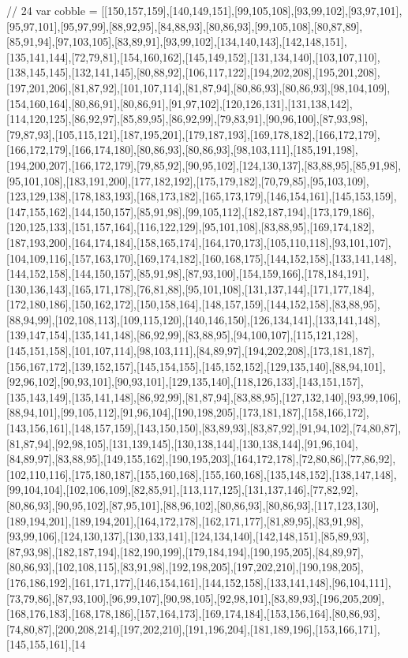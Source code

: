 // 24
var cobble = [[150,157,159],[140,149,151],[99,105,108],[93,99,102],[93,97,101],[95,97,101],[95,97,99],[88,92,95],[84,88,93],[80,86,93],[99,105,108],[80,87,89],[85,91,94],[97,103,105],[83,89,91],[93,99,102],[134,140,143],[142,148,151],[135,141,144],[72,79,81],[154,160,162],[145,149,152],[131,134,140],[103,107,110],[138,145,145],[132,141,145],[80,88,92],[106,117,122],[194,202,208],[195,201,208],[197,201,206],[81,87,92],[101,107,114],[81,87,94],[80,86,93],[80,86,93],[98,104,109],[154,160,164],[80,86,91],[80,86,91],[91,97,102],[120,126,131],[131,138,142],[114,120,125],[86,92,97],[85,89,95],[86,92,99],[79,83,91],[90,96,100],[87,93,98],[79,87,93],[105,115,121],[187,195,201],[179,187,193],[169,178,182],[166,172,179],[166,172,179],[166,174,180],[80,86,93],[80,86,93],[98,103,111],[185,191,198],[194,200,207],[166,172,179],[79,85,92],[90,95,102],[124,130,137],[83,88,95],[85,91,98],[95,101,108],[183,191,200],[177,182,192],[175,179,182],[70,79,85],[95,103,109],[123,129,138],[178,183,193],[168,173,182],[165,173,179],[146,154,161],[145,153,159],[147,155,162],[144,150,157],[85,91,98],[99,105,112],[182,187,194],[173,179,186],[120,125,133],[151,157,164],[116,122,129],[95,101,108],[83,88,95],[169,174,182],[187,193,200],[164,174,184],[158,165,174],[164,170,173],[105,110,118],[93,101,107],[104,109,116],[157,163,170],[169,174,182],[160,168,175],[144,152,158],[133,141,148],[144,152,158],[144,150,157],[85,91,98],[87,93,100],[154,159,166],[178,184,191],[130,136,143],[165,171,178],[76,81,88],[95,101,108],[131,137,144],[171,177,184],[172,180,186],[150,162,172],[150,158,164],[148,157,159],[144,152,158],[83,88,95],[88,94,99],[102,108,113],[109,115,120],[140,146,150],[126,134,141],[133,141,148],[139,147,154],[135,141,148],[86,92,99],[83,88,95],[94,100,107],[115,121,128],[145,151,158],[101,107,114],[98,103,111],[84,89,97],[194,202,208],[173,181,187],[156,167,172],[139,152,157],[145,154,155],[145,152,152],[129,135,140],[88,94,101],[92,96,102],[90,93,101],[90,93,101],[129,135,140],[118,126,133],[143,151,157],[135,143,149],[135,141,148],[86,92,99],[81,87,94],[83,88,95],[127,132,140],[93,99,106],[88,94,101],[99,105,112],[91,96,104],[190,198,205],[173,181,187],[158,166,172],[143,156,161],[148,157,159],[143,150,150],[83,89,93],[83,87,92],[91,94,102],[74,80,87],[81,87,94],[92,98,105],[131,139,145],[130,138,144],[130,138,144],[91,96,104],[84,89,97],[83,88,95],[149,155,162],[190,195,203],[164,172,178],[72,80,86],[77,86,92],[102,110,116],[175,180,187],[155,160,168],[155,160,168],[135,148,152],[138,147,148],[99,104,104],[102,106,109],[82,85,91],[113,117,125],[131,137,146],[77,82,92],[80,86,93],[90,95,102],[87,95,101],[88,96,102],[80,86,93],[80,86,93],[117,123,130],[189,194,201],[189,194,201],[164,172,178],[162,171,177],[81,89,95],[83,91,98],[93,99,106],[124,130,137],[130,133,141],[124,134,140],[142,148,151],[85,89,93],[87,93,98],[182,187,194],[182,190,199],[179,184,194],[190,195,205],[84,89,97],[80,86,93],[102,108,115],[83,91,98],[192,198,205],[197,202,210],[190,198,205],[176,186,192],[161,171,177],[146,154,161],[144,152,158],[133,141,148],[96,104,111],[73,79,86],[87,93,100],[96,99,107],[90,98,105],[92,98,101],[83,89,93],[196,205,209],[168,176,183],[168,178,186],[157,164,173],[169,174,184],[153,156,164],[80,86,93],[74,80,87],[200,208,214],[197,202,210],[191,196,204],[181,189,196],[153,166,171],[145,155,161],[14